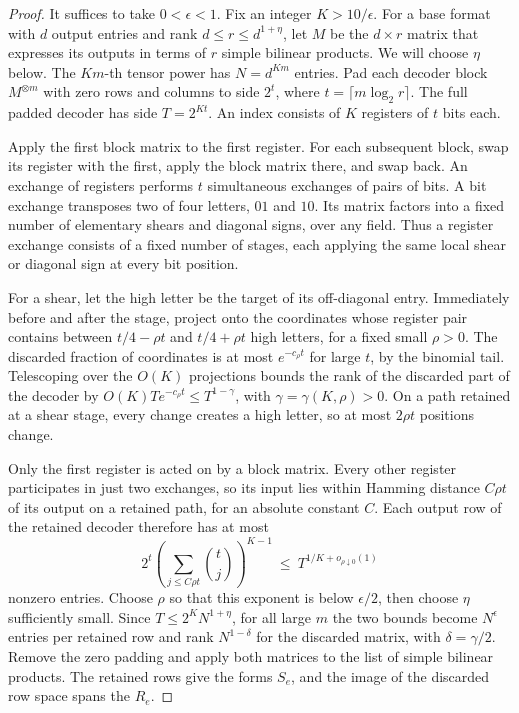 \begin{proof}
It suffices to take \(0<\epsilon<1\). Fix an integer \(K>10/\epsilon\).
For a base format with \(d\) output entries and rank
\(d\le r\le d^{1+\eta}\), let \(M\) be the \(d\times r\) matrix that
expresses its outputs in terms of \(r\) simple bilinear products.
We will choose \(\eta\) below. The \(Km\)-th tensor power has
\(N=d^{Km}\) entries. Pad each decoder block \(M^{\otimes m}\) with
zero rows and columns to side \(2^t\), where \(t=\lceil m\log_2 r\rceil\).
The full padded decoder has side \(T=2^{Kt}\). An index consists of
\(K\) registers of \(t\) bits each.

Apply the first block matrix to the first register. For each subsequent
block, swap its register with the first, apply the block matrix there,
and swap back. An exchange of registers performs \(t\) simultaneous
exchanges of pairs of bits. A bit exchange transposes two of four
letters, \(01\) and \(10\). Its matrix factors into a fixed number of
elementary shears and diagonal signs, over any field. Thus a register
exchange consists of a fixed number of stages, each applying the same
local shear or diagonal sign at every bit position.

For a shear, let the high letter be the target of its off-diagonal
entry. Immediately before and after the stage, project onto the
coordinates whose register pair contains between \(t/4-\rho t\) and
\(t/4+\rho t\) high letters, for a fixed small \(\rho>0\).
The discarded fraction of coordinates is at most \(e^{-c_\rho t}\)
for large \(t\), by the binomial tail. Telescoping over the \(O(K)\)
projections bounds the rank of the discarded part of the decoder by
\(O(K)Te^{-c_\rho t}\le T^{1-\gamma}\), with \(\gamma=\gamma(K,\rho)>0\).
On a path retained at a shear stage, every change creates a high
letter, so at most \(2\rho t\) positions change.

Only the first register is acted on by a block matrix. Every other
register participates in just two exchanges, so its input lies within
Hamming distance \(C\rho t\) of its output on a retained path, for an
absolute constant \(C\). Each output row of the retained decoder
therefore has at most
\[
       2^t\left(\sum_{j\le C\rho t}\binom{t}{j}\right)^{K-1}
       \ \le\ T^{1/K+o_{\rho\downarrow0}(1)}
\]
nonzero entries. Choose \(\rho\) so that this exponent is below
\(\epsilon/2\), then choose \(\eta\) sufficiently small. Since
\(T\le 2^K N^{1+\eta}\), for all large \(m\) the two bounds become
\(N^\epsilon\) entries per retained row and rank \(N^{1-\delta}\)
for the discarded matrix, with \(\delta=\gamma/2\). Remove the
zero padding and apply both matrices to the list of simple bilinear
products. The retained rows give the forms \(S_e\), and the image of
the discarded row space spans the \(R_e\).
\end{proof}

